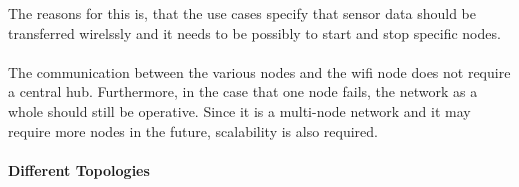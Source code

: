 The reasons for this is, that the use cases specify that sensor data should be transferred wirelssly and it needs to be possibly to start and stop specific nodes.
\\\\
The communication between the various nodes and the wifi node does not require a central hub.
Furthermore, in the case that one node fails, the network as a whole should still be operative.
Since it is a multi-node network and it may require more nodes in the future, scalability is also required.

\paragraph{Different Topologies}~\\
